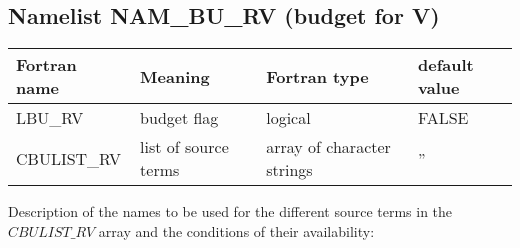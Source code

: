 \subsection{Namelist NAM\_BU\_RV (budget for V)}

\begin{longtable} {|p{}|p{}|>{\centering}p{}|p{}<{\centering}|}
\hline
Fortran name & Meaning & Fortran type & default value \\
\hline \hline
\endhead
LBU\_RV & budget flag & logical & FALSE\index{LBU\_RV!\innam{NAM\_BU\_RV}} \\\hline
CBULIST\_RV & list of source terms & array of character strings & ''\index{CBULIST\_RV!\innam{NAM\_BU\_RV}} \\\hline
\end{longtable}

Description of the names to be used for the different source terms in the $CBULIST\_RV$ array and the conditions of their availability:

